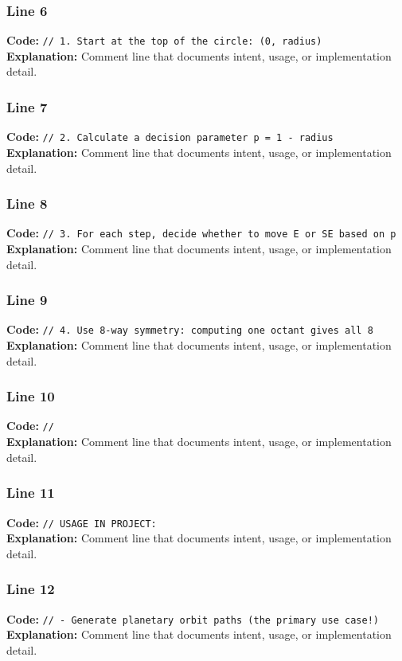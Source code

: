 \documentclass[11pt,a4paper]{article}
\begin{document}
\subsubsection*{Line 6}
\textbf{Code:} \verb|// 1. Start at the top of the circle: (0, radius)|\\
\textbf{Explanation:} Comment line that documents intent, usage, or implementation detail.

\subsubsection*{Line 7}
\textbf{Code:} \verb|// 2. Calculate a decision parameter p = 1 - radius|\\
\textbf{Explanation:} Comment line that documents intent, usage, or implementation detail.

\subsubsection*{Line 8}
\textbf{Code:} \verb|// 3. For each step, decide whether to move E or SE based on p|\\
\textbf{Explanation:} Comment line that documents intent, usage, or implementation detail.

\subsubsection*{Line 9}
\textbf{Code:} \verb|// 4. Use 8-way symmetry: computing one octant gives all 8|\\
\textbf{Explanation:} Comment line that documents intent, usage, or implementation detail.

\subsubsection*{Line 10}
\textbf{Code:} \verb|//|\\
\textbf{Explanation:} Comment line that documents intent, usage, or implementation detail.

\subsubsection*{Line 11}
\textbf{Code:} \verb|// USAGE IN PROJECT:|\\
\textbf{Explanation:} Comment line that documents intent, usage, or implementation detail.

\subsubsection*{Line 12}
\textbf{Code:} \verb|// - Generate planetary orbit paths (the primary use case!)|\\
\textbf{Explanation:} Comment line that documents intent, usage, or implementation detail.
\end{document}
